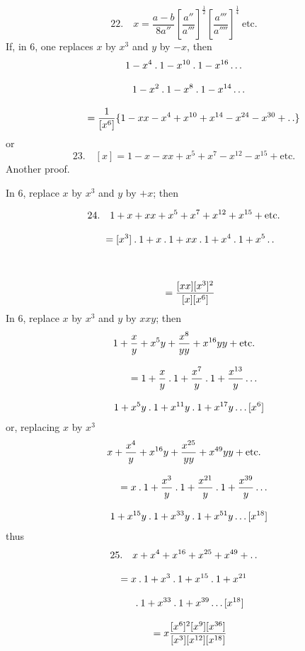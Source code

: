 \[
22.\quad x=\frac{a-b}{8a''}\left[\frac{a''}{a'''}\right]^{\frac12}
\left[\frac{a'''}{a''''}\right]^{\frac14}\ \mathrm{etc.}
\]
If, in 6, one replaces $x$ by $x^3$ and $y$ by $-x$, then
\[
\begin{gathered}
1-x^4\mathbin{.}1-x^{10}\mathbin{.}1-x^{16}\mathinner{.\,.\,.}
\\[8pt]\quad{}1-x^2\mathbin{.}1-x^8\mathbin{.}1-x^{14}\mathinner{.\,.\,.}\\[8pt]
\qquad=\frac{1}{[x^6]}\{1-xx-x^4+x^{10}+x^{14}-x^{24}-x^{30}+\mathinner{.\,.}\}
\end{gathered}
\]
or
\[
23.\quad[x]=1-x-xx+x^5+x^7-x^{12}-x^{15}+\mathrm{etc.}
\]
Another proof.

In 6, replace $x$ by $x^3$ and $y$ by $+x$; then

\[
\begin{gathered}
24.\quad 1+x+xx+x^{5}+x^{7}+x^{12}+x^{15}+\mathrm{etc.}
 \\[8pt]\quad{}= [x^{3}]\mathbin{.}1+x\mathbin{.}1+xx\mathbin{.}1+x^{4}\mathbin{.}1+x^{5}\mathinner{.\,.}\\[8pt]
 \\[8pt]\quad{}=\frac{[xx][x^{3}]^{2}}{[x][x^{6}]}
\end{gathered}
\]
In 6, replace $x$ by $x^{3}$ and $y$ by $xxy$; then
\[
\begin{gathered}
1+\frac{x}{y}+x^{5}y+\frac{x^{8}}{yy}+x^{16}yy+\mathrm{etc.}\\[8pt]
\qquad=1+\frac{x}{y}\mathbin{.}1+\frac{x^{7}}{y}\mathbin{.}1+\frac{x^{13}}{y}\mathinner{.\,.\,.}
  \\[8pt]\quad{}1+x^{5}y\mathbin{.}1+x^{11}y\mathbin{.}1+x^{17}y\mathinner{.\,.\,.}[x^{6}]
\end{gathered}
\]
or, replacing $x$ by $x^{3}$
\[
\begin{gathered}
x+\frac{x^{4}}{y}+x^{16}y+\frac{x^{25}}{yy}+x^{49}yy+\mathrm{etc.}\\[8pt]
\qquad=x\mathbin{.}1+\frac{x^{3}}{y}\mathbin{.}1+\frac{x^{21}}{y}\mathbin{.}1+\frac{x^{39}}{y}\mathinner{.\,.\,.}
  \\[8pt]\quad{}1+x^{15}y\mathbin{.}1+x^{33}y\mathbin{.}1+x^{51}y\mathinner{.\,.\,.}[x^{18}]
\end{gathered}
\]
thus
\[
\begin{gathered}
25.\quad x+x^{4}+x^{16}+x^{25}+x^{49}+\mathinner{.\,.}\\[8pt]
 =x\mathbin{.}1+x^{3}\mathbin{.}1+x^{15}\mathbin{.}1+x^{21}\\[8pt]\quad{}\mathbin{.}1+x^{33}\mathbin{.}1+x^{39}\mathinner{.\,.\,.}[x^{18}]
 \\[8pt]\quad{}=x\frac{[x^{6}]^{2}[x^{9}][x^{36}]}{[x^{3}][x^{12}][x^{18}]}
\end{gathered}
\]

